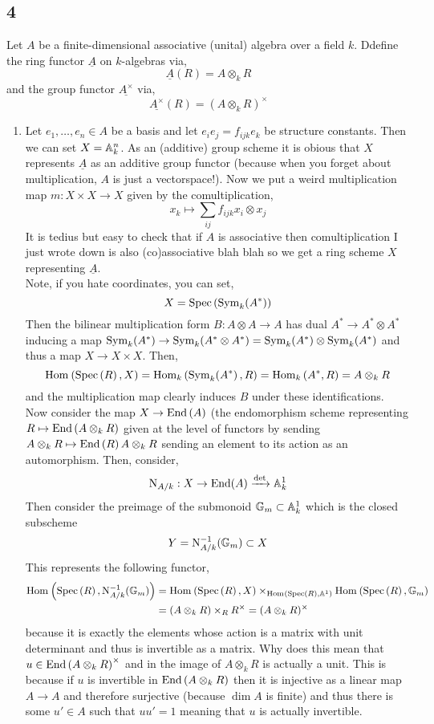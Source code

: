 \documentclass[12pt]{article}
\begin{document}
\subsection{4}

\newcommand{\Nm}{\mathrm{N}}
\newcommand{\Nrd}{\mathrm{Nrd}}

Let $A$ be a finite-dimensional associative (unital) algebra over a field $k$. Ddefine the ring functor $\underline{A}$ on $k$-algebras via,
\[ \underline{A}(R) = A \otimes_k R \]
and the group functor $\underline{A^\times}$ via,
\[ \underline{A^\times}(R) = (A \otimes_k R)^\times \]

\begin{enumerate}
\item 
Let $e_1, \dots, e_n \in A$ be a basis and let $e_i e_j = f_{ijk} e_k$ be structure constants. Then we can set $X = \mathbb{A}^n_k$. As an (additive) group scheme it is obious that $X$ represents $\underline{A}$ as an additive group functor (because when you forget about multiplication, $A$ is just a vectorspace!). Now we put a weird multiplication map $m : X \times X \to X$ given by the comultiplication,
\[ x_k \mapsto \sum_{ij} f_{ijk} x_i \otimes x_j \]
It is tedius but easy to check that if $A$ is associative then comultiplication I just wrote down is also (co)associative blah blah so we get a ring scheme $X$ representing $\underline{A}$. 
\bigskip\\
Note, if you hate coordinates, you can set,
\[ X = \mathrm{Spec}\left( \mathrm{Sym}_{k}\! \left( A^* \right) \right) \]
Then the bilinear multiplication form $B : A \otimes A \to A$ has dual $A^* \to A^* \otimes A^*$ inducing a map $\mathrm{Sym}_{k}\! \left( A^* \right) \to \mathrm{Sym}_{k}\! \left( A^* \otimes A^* \right) = \mathrm{Sym}_{k}\! \left( A^* \right) \otimes \mathrm{Sym}_{k}\! \left( A^* \right)$ and thus a map $X \to X \times X$. Then,
\[ \mathrm{Hom}_{} \left( \mathrm{Spec}\left( R \right), X \right) = \mathrm{Hom}_{k} \left( \mathrm{Sym}_{k}\! \left( A^* \right), R \right) = \mathrm{Hom}_{k} \left( A^*, R \right) = A \otimes_k R \]
and the multiplication map clearly induces $B$ under these identifications.
\bigskip\\
Now consider the map $X \to \mathrm{End}\left( A \right)$ (the endomorphism scheme representing $R \mapsto \mathrm{End}\left( A \otimes_k R \right)$ given at the level of functors by sending $A \otimes_k R \mapsto \mathrm{End}\left( R \right){A \otimes_k R}$ sending an element to its action as an automorphism. Then, consider,
\[ \Nm_{A/k} : X \to \mathrm{End}(A) \xrightarrow{\det} \A^1_k \]
Then consider the preimage of the submonoid $\mathbb{G}_m \subset \mathbb{A}^1_k$ which is the closed subscheme
\[ Y = \Nm_{A/k}^{-1}(\Gm) \subset X \]
This represents the following functor,
\begin{align*}
\Hom{}{\Spec{R}}{\Nm_{A/k}^{-1}(\Gm)} & = \Hom{}{\Spec{R}}{X} \times_{\Hom{}{\Spec{R}}{\A^1}} \Hom{}{\Spec{R}}{\Gm} 
\\
& = (A \otimes_k R) \times_{R} R^\times = (A \otimes_k R)^\times 
\end{align*}
because it is exactly the elements whose action is a matrix with unit determinant and thus is invertible as a matrix. Why does this mean that $u \in \mathrm{End}\left( A \otimes_k R \right)^\times$ and in the image of $A \otimes_k R$ is actually a unit. This is because if $u$ is invertible in $\mathrm{End}\left( A \otimes_k R \right)$ then it is injective as a linear map $A \to A$ and therefore surjective (because $\dim{A}$ is finite) and thus there is some $u' \in A$ such that $uu' = 1$ meaning that $u$ is actually invertible.


\end{enumerate}
\end{document}
